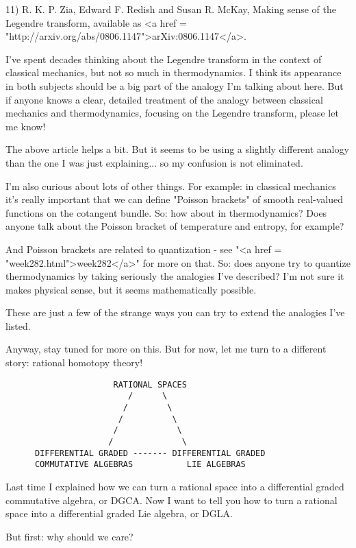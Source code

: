 11) R. K. P. Zia, Edward F. Redish and Susan R. McKay, Making sense of
the Legendre transform, available as <a href =
"http://arxiv.org/abs/0806.1147">arXiv:0806.1147</a>.


I've spent decades thinking about the Legendre transform in the
context of classical mechanics, but not so much in thermodynamics.  I
think its appearance in both subjects should be a big part of the
analogy I'm talking about here.  But if anyone knows a clear, detailed
treatment of the analogy between classical mechanics and
thermodynamics, focusing on the Legendre transform, please let me
know!

The above article helps a bit.  But it seems to be using a slightly
different analogy than the one I was just explaining... so my
confusion is not eliminated.

I'm also curious about lots of other things.  For example: in
classical mechanics it's really important that we can define 
"Poisson brackets" of smooth real-valued functions 
on the cotangent bundle.  So: how about in thermodynamics?  
Does anyone talk about the Poisson bracket of temperature and 
entropy, for example?

And Poisson brackets are related to quantization - see "<a href =
"week282.html">week282</a>" for more on that.  So: does anyone
try to quantize thermodynamics by taking seriously the analogies I've
described?  I'm not sure it makes physical sense, but it seems
mathematically possible.

These are just a few of the strange ways you can try to extend the
analogies I've listed.

Anyway, stay tuned for more on this.  But for now, let me turn to a
different story: rational homotopy theory!

\begin{verbatim}
                      RATIONAL SPACES
                         /      \  
                        /        \  
                       /          \  
                      /            \
                     /              \
      DIFFERENTIAL GRADED ------- DIFFERENTIAL GRADED
      COMMUTATIVE ALGEBRAS           LIE ALGEBRAS
\end{verbatim}
    

Last time I explained how we can turn a rational space into a
differential graded commutative algebra, or DGCA.  Now I want to tell
you how to turn a rational space into a differential graded Lie
algebra, or DGLA.

But first: why should we care?  


